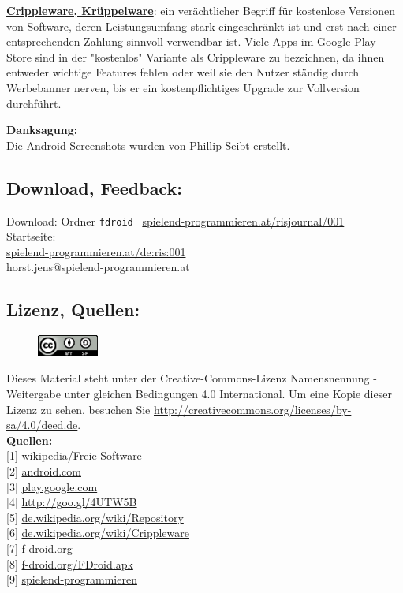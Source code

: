 \href{http://de.wikipedia.org/wiki/Crippleware}{\textbf{Crippleware, Krüppelware}}: ein verächtlicher Begriff für kostenlose Versionen von Software, deren Leistungsumfang stark eingeschränkt ist und erst nach einer entsprechenden Zahlung sinnvoll verwendbar ist. Viele Apps im Google Play Store sind in der "kostenlos" Variante als Crippleware zu bezeichnen, da ihnen entweder wichtige Features fehlen oder weil sie den Nutzer ständig durch Werbebanner nerven, bis er ein kostenpflichtiges Upgrade zur Vollversion durchführt.

\textbf{Danksagung:} \\
Die Android-Screenshots wurden von Phillip Seibt erstellt.

\subsection*{Download, Feedback:}
\footnotesize{
Download: Ordner \texttt{fdroid} \Mundus\ \href{http://spielend-programmieren.at/risjournal/001}{spielend-programmieren.at/risjournal/001}\\
Startseite:\\
\href{http://spielend-programmieren.at/de:ris:001}{spielend-programmieren.at/de:ris:001}\\ 
\Letter\:  horst.jens@spielend-programmieren.at \\}
\normalsize{}

\subsection*{Lizenz, Quellen:}
\begin{figure}
\includegraphics[width=2cm]{fdroid/ccbysa88x31.png}
\end{figure}
Dieses Material steht unter der Creative-Commons-Lizenz Namensnennung - Weitergabe unter gleichen Bedingungen 4.0 International. Um eine Kopie dieser Lizenz zu sehen, besuchen Sie \url{http://creativecommons.org/licenses/by-sa/4.0/deed.de}. \\

\textbf{Quellen:} \\
{[}1{]} \href{http://de.wikipedia.org/wiki/Freie_Software}{wikipedia/Freie-Software} \\
{[}2{]} \href{http://www.android.com}{android.com} \\
{[}3{]} \href{https://play.google.com/store}{play.google.com} \\
{[}4{]} \href{http://de.wikipedia.org/wiki/GNU_General_Public_License}{http://goo.gl/4UTW5B} \\
{[}5{]} \href{http://de.wikipedia.org/wiki/Repository}{de.wikipedia.org/wiki/Repository} \\
{[}6{]} \href{http://de.wikipedia.org/wiki/Crippleware}{de.wikipedia.org/wiki/Crippleware} \\
{[}7{]} \href{http://f-droid.org/}{f-droid.org} \\
{[}8{]} \href{http://f-droid.org/FDroid.apk}{f-droid.org/FDroid.apk} \\
{[}9{]} \href{http://spielend-programmieren.at}{spielend-programmieren} 
